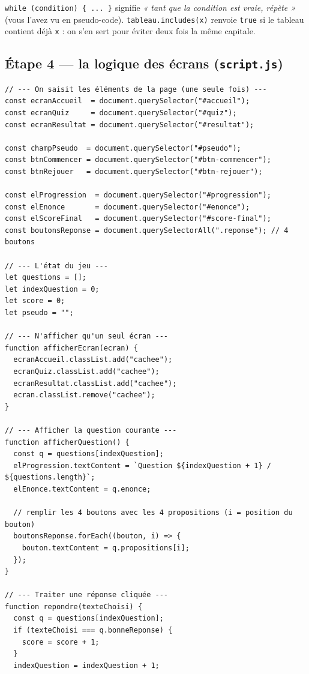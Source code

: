 \documentclass[11pt,a4paper]{article}
\newcommand{\code}[1]{\texttt{#1}}
\begin{document}
\begin{infobox}
\code{while (condition) \{ ... \}} signifie \emph{« tant que la condition est vraie, répète »} (vous l'avez vu en pseudo-code). \code{tableau.includes(x)} renvoie \code{true} si le tableau contient déjà \code{x} : on s'en sert pour éviter deux fois la même capitale.
\end{infobox}

\subsection{Étape 4 --- la logique des écrans (\texttt{script.js})}

\begin{lstlisting}[style=js]
// --- On saisit les éléments de la page (une seule fois) ---
const ecranAccueil  = document.querySelector("#accueil");
const ecranQuiz     = document.querySelector("#quiz");
const ecranResultat = document.querySelector("#resultat");

const champPseudo  = document.querySelector("#pseudo");
const btnCommencer = document.querySelector("#btn-commencer");
const btnRejouer   = document.querySelector("#btn-rejouer");

const elProgression  = document.querySelector("#progression");
const elEnonce       = document.querySelector("#enonce");
const elScoreFinal   = document.querySelector("#score-final");
const boutonsReponse = document.querySelectorAll(".reponse"); // 4 boutons

// --- L'état du jeu ---
let questions = [];
let indexQuestion = 0;
let score = 0;
let pseudo = "";

// --- N'afficher qu'un seul écran ---
function afficherEcran(ecran) {
  ecranAccueil.classList.add("cachee");
  ecranQuiz.classList.add("cachee");
  ecranResultat.classList.add("cachee");
  ecran.classList.remove("cachee");
}

// --- Afficher la question courante ---
function afficherQuestion() {
  const q = questions[indexQuestion];
  elProgression.textContent = `Question ${indexQuestion + 1} / ${questions.length}`;
  elEnonce.textContent = q.enonce;

  // remplir les 4 boutons avec les 4 propositions (i = position du bouton)
  boutonsReponse.forEach((bouton, i) => {
    bouton.textContent = q.propositions[i];
  });
}

// --- Traiter une réponse cliquée ---
function repondre(texteChoisi) {
  const q = questions[indexQuestion];
  if (texteChoisi === q.bonneReponse) {
    score = score + 1;
  }
  indexQuestion = indexQuestion + 1;


\end{lstlisting}
\end{document}

